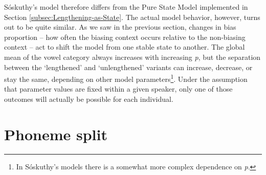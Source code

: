 Sóskuthy's model therefore differs from the Pure State Model implemented
in Section \ref{subsec:Lengthening-as-State}. The actual model behavior,
however, turns out to be quite similar. As we saw in the previous
section, changes in bias proportion – how often the biasing context
occurs relative to the non-biasing context – act to shift the model
from one stable state to another. The global mean of the vowel category
always increases with increasing \emph{p}, but the separation between
the `lengthened' and `unlengthened' variants can increase, decrease,
or stay the same, depending on other model parameters\footnote{In Sóskuthy's models there is a somewhat more complex dependence on
\emph{p}. }. Under the assumption that parameter values are fixed within a given
speaker, only one of those outcomes will actually be possible for
each individual. 

\section{\label{subsec:Phoneme-Split}Phoneme split}

